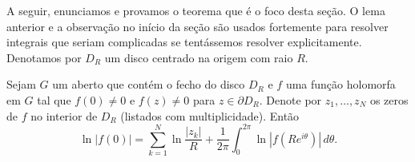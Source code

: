     A seguir, enunciamos e provamos o teorema que é o foco desta seção. O lema
    anterior e a observação no início da seção são usados fortemente para resolver
    integrais que seriam complicadas se tentássemos resolver explicitamente. 
    Denotamos por $D_R$ um disco centrado na origem com raio $R$.
    \begin{teorema}
    \label{teo:form-jensen}
        Sejam $G$ um aberto que contém o fecho do disco $D_R$ e $f$ uma função
        holomorfa em $G$ tal que $f(0) \neq 0$ e $f(z) \neq 0$ para 
        $z \in \partial D_R$. Denote por $z_1, \dots, z_N$ os zeros de $f$ no 
        interior de $D_R$ (listados com multiplicidade). Então
        \begin{equation*}
            \ln{|f(0)|} = \sum_{k = 1}^{N}\ln{\frac{|z_k|}{R}} 
            + \frac{1}{2\pi}\int_{0}^{2\pi}\ln{|f(Re^{i\theta})|} \, d\theta.
        \end{equation*}
    \end{teorema}
